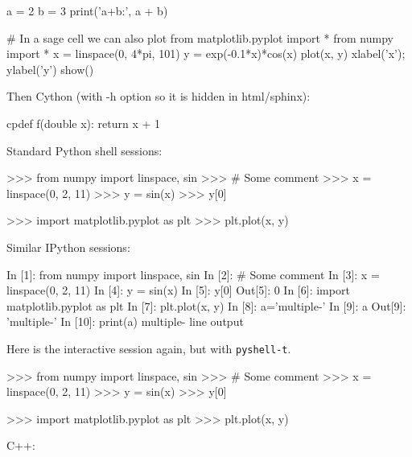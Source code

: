 \documentclass[%
oneside,                 %
final,                   %
10pt]{article}
\theoremstyle{definition}
\begin{document}
\bpypro
a = 2
b = 3
print('a+b:', a + b)

# In a sage cell we can also plot
from matplotlib.pyplot import *
from numpy import *
x = linspace(0, 4*pi, 101)
y = exp(-0.1*x)*cos(x)
plot(x, y)
xlabel('x'); ylabel('y')
show()

\epypro


Then Cython (with -h option so it is hidden in html/sphinx):




\bcycod
cpdef f(double x):
    return x + 1

\ecycod


Standard Python shell sessions:










\bpyshell
>>> from numpy import linspace, sin
>>> # Some comment
>>> x = linspace(0, 2, 11)
>>> y = sin(x)
>>> y[0]

>>> import matplotlib.pyplot as plt
>>> plt.plot(x, y)

\epyshell


Similar IPython sessions:

















\bipy
In [1]: from numpy import linspace, sin
In [2]: # Some comment
In [3]: x = linspace(0, 2, 11)
In [4]: y = sin(x)
In [5]: y[0]
Out[5]: 0
In [6]: import matplotlib.pyplot as plt
In [7]: plt.plot(x, y)
In [8]: a='multiple-\nline\noutput'
In [9]: a
Out[9]: 'multiple-\nline\noutput'
In [10]: print(a)
multiple-
line
output

\eipy


Here is the interactive session again, but with \texttt{pyshell-t}.










\bpyshell
>>> from numpy import linspace, sin
>>> # Some comment
>>> x = linspace(0, 2, 11)
>>> y = sin(x)
>>> y[0]

>>> import matplotlib.pyplot as plt
>>> plt.plot(x, y)

\epyshell


C++:
\end{document}
